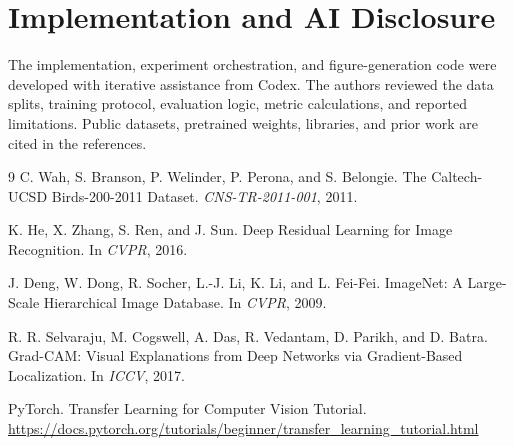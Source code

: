 \documentclass[10pt,twocolumn,letterpaper]{article}
\begin{document}
\section*{Implementation and AI Disclosure}
The implementation, experiment orchestration, and figure-generation code were
developed with iterative assistance from Codex. The authors reviewed the data
splits, training protocol, evaluation logic, metric calculations, and reported
limitations. Public datasets, pretrained weights, libraries, and prior work
are cited in the references.

\begin{thebibliography}{9}
\small
{}
C. Wah, S. Branson, P. Welinder, P. Perona, and S. Belongie.
\newblock The Caltech-UCSD Birds-200-2011 Dataset.
\newblock \emph{CNS-TR-2011-001}, 2011.

K. He, X. Zhang, S. Ren, and J. Sun.
\newblock Deep Residual Learning for Image Recognition.
\newblock In \emph{CVPR}, 2016.

J. Deng, W. Dong, R. Socher, L.-J. Li, K. Li, and L. Fei-Fei.
\newblock ImageNet: A Large-Scale Hierarchical Image Database.
\newblock In \emph{CVPR}, 2009.

R. R. Selvaraju, M. Cogswell, A. Das, R. Vedantam, D. Parikh, and D. Batra.
\newblock Grad-CAM: Visual Explanations from Deep Networks via
Gradient-Based Localization.
\newblock In \emph{ICCV}, 2017.

PyTorch.
\newblock Transfer Learning for Computer Vision Tutorial.
\newblock \url{https://docs.pytorch.org/tutorials/beginner/transfer_learning_tutorial.html}
\end{thebibliography}
\end{document}
